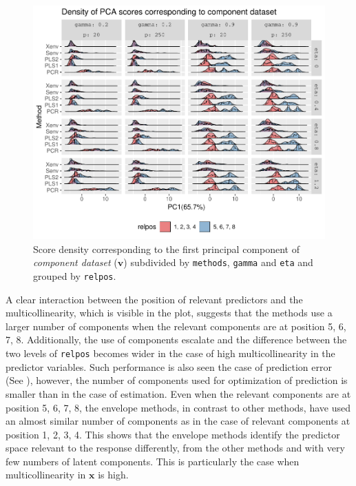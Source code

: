 \documentclass[12pt,3p,authoryear]{elsarticle}
\begin{document}
\begin{figure}[!htb]
\includegraphics[width=1\linewidth]{Images/pdf/comp-pca-hist-mthd-gamma-relpos-1} \caption{Score density corresponding to the first principal
component of \emph{component dataset} (\(\mathbf{v}\)) subdivided by
\texttt{methods}, \texttt{gamma} and \texttt{eta} and grouped by
\texttt{relpos}.}\label{fig:comp-pca-hist-mthd-gamma-relpos}
\end{figure}

A clear interaction between the position of relevant predictors and the
multicollinearity, which is visible in the plot, suggests that the
methods use a larger number of components when the relevant components
are at position 5, 6, 7, 8. Additionally, the use of components escalate
and the difference between the two levels of \texttt{relpos} becomes
wider in the case of high multicollinearity in the predictor variables.
Such performance is also seen the case of prediction error (See
\citet{rimal2019pred}), however, the number of components used for
optimization of prediction is smaller than in the case of estimation.
Even when the relevant components are at position 5, 6, 7, 8, the
envelope methods, in contrast to other methods, have used an almost
similar number of components as in the case of relevant components at
position 1, 2, 3, 4. This shows that the envelope methods identify the
predictor space relevant to the response differently, from the other
methods and with very few numbers of latent components. This is
particularly the case when multicollinearity in \(\mathbf{x}\) is high.
\end{document}
